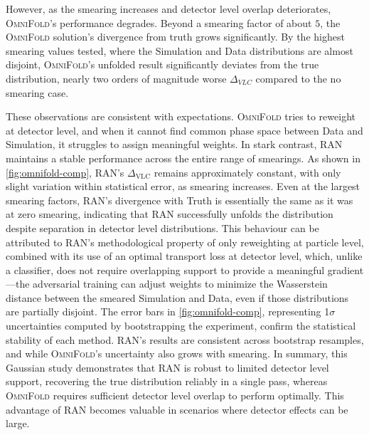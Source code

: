 {{        However, as the smearing increases and detector level overlap deteriorates, \textsc{OmniFold}’s performance degrades.
        Beyond a smearing factor of about $5$, the \textsc{OmniFold} solution’s divergence from truth grows significantly.
        By the highest smearing values tested, where the Simulation and Data distributions are almost disjoint, \textsc{OmniFold}’s unfolded result significantly deviates from the true distribution, nearly two orders of magnitude worse $\Delta_{VLC}$ compared to the no smearing case.
        
        These observations are consistent with expectations.
        \textsc{OmniFold} tries to reweight at detector level, and when it cannot find common phase space between Data and Simulation, it struggles to assign meaningful weights.
        In stark contrast, RAN maintains a stable performance across the entire range of smearings.
        As shown in \cref{fig:omnifold-comp}, RAN's $\Delta_{\text{VLC}}$ remains approximately constant, with only slight variation within statistical error, as smearing increases.
        Even at the largest smearing factors, RAN's divergence with Truth is essentially the same as it was at zero smearing, indicating that RAN successfully unfolds the distribution despite separation in detector level distributions.
        This behaviour can be attributed to RAN's methodological property of only reweighting at particle level, combined with its use of an optimal transport loss at detector level, which, unlike a classifier, does not require overlapping support to provide a meaningful gradient---the adversarial training can adjust weights to minimize the Wasserstein distance between the smeared Simulation and Data, even if those distributions are partially disjoint.
        The error bars in \cref{fig:omnifold-comp}, representing 1$\sigma$ uncertainties computed by bootstrapping the experiment, confirm the statistical stability of each method.
        RAN’s results are consistent across bootstrap resamples, and while \textsc{OmniFold}’s uncertainty also grows with smearing.
        In summary, this Gaussian study demonstrates that RAN is robust to limited detector level support, recovering the true distribution reliably in a single pass, whereas \textsc{OmniFold} requires sufficient detector level overlap to perform optimally.
        This advantage of RAN becomes valuable in scenarios where detector effects can be large.
\begin{figure}

\end{figure}}}
